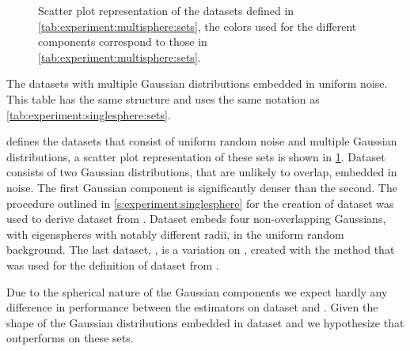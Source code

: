 
\begin{figure}
	\centering
	
	\caption{Scatter plot representation of the datasets defined in \cref{tab:experiment:multisphere:sets}, the colors used for the different components correspond to those in \cref{tab:experiment:multisphere:sets}.}
	\label{fig:experiment:multisphere:sets}
\end{figure}

\begin{table*}
	\centering
	
	\caption{The datasets with multiple Gaussian distributions embedded in uniform noise. This table has the same structure and uses the same notation as \cref{tab:experiment:singlesphere:sets}.} 	
	\label{tab:experiment:multisphere:sets}
\end{table*}

 defines the datasets that consist of uniform random noise and multiple Gaussian distributions, a scatter plot representation of these sets is shown in \cref{fig:experiment:multisphere:sets}. 
	Dataset \ferdosiTwo consists of two Gaussian distributions, that are unlikely to overlap, embedded in noise. The first Gaussian component is significantly denser than the second. 
	The procedure outlined in \cref{s:experiment:singlesphere} for the creation of dataset \baakmanOne was used to derive dataset \baakmanTwo from \ferdosiTwo.
	Dataset \ferdosiThree embeds four non-overlapping Gaussians, with eigenspheres with notably different radii, in the uniform random background. 
	The last dataset, \baakmanThree, is a variation on \ferdosiThree, created with the method that was used for the definition of dataset \baakmanOne from \ferdosiOne. 

	Due to the spherical nature of the Gaussian components we expect hardly any difference in performance between the estimators on dataset \ferdosiTwo and \ferdosiThree. Given the shape of the Gaussian distributions embedded in dataset \baakmanTwo and \baakmanThree we hypothesize that \sambe outperforms \mbe on these sets.